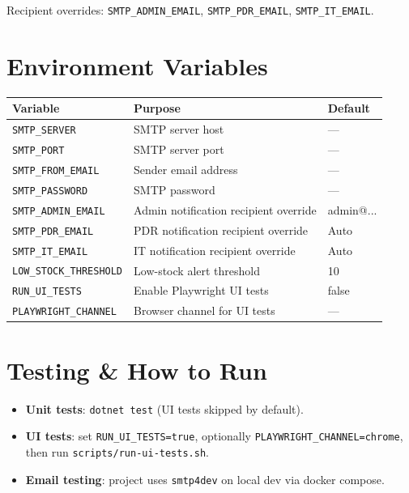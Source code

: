 \documentclass[11pt,a4paper]{article}
\begin{document}
\noindent Recipient overrides: \texttt{SMTP\_ADMIN\_EMAIL}, \texttt{SMTP\_PDR\_EMAIL}, \texttt{SMTP\_IT\_EMAIL}.

\section{Environment Variables}

\begin{longtable}{| l | p{7cm} | l |}
\hline
\textbf{Variable} & \textbf{Purpose} & \textbf{Default} \\
\hline
\endfirsthead
\texttt{SMTP\_SERVER} & SMTP server host & --- \\
\hline
\texttt{SMTP\_PORT} & SMTP server port & --- \\
\hline
\texttt{SMTP\_FROM\_EMAIL} & Sender email address & --- \\
\hline
\texttt{SMTP\_PASSWORD} & SMTP password & --- \\
\hline
\texttt{SMTP\_ADMIN\_EMAIL} & Admin notification recipient override & admin@... \\
\hline
\texttt{SMTP\_PDR\_EMAIL} & PDR notification recipient override & Auto \\
\hline
\texttt{SMTP\_IT\_EMAIL} & IT notification recipient override & Auto \\
\hline
\texttt{LOW\_STOCK\_THRESHOLD} & Low-stock alert threshold & 10 \\
\hline
\texttt{RUN\_UI\_TESTS} & Enable Playwright UI tests & false \\
\hline
\texttt{PLAYWRIGHT\_CHANNEL} & Browser channel for UI tests & --- \\
\hline
\end{longtable}

\section{Testing \& How to Run}
\begin{itemize}
  \item \textbf{Unit tests}: \texttt{dotnet test} (UI tests skipped by default).
  \item \textbf{UI tests}: set \texttt{RUN\_UI\_TESTS=true}, optionally \texttt{PLAYWRIGHT\_CHANNEL=chrome}, then run \texttt{scripts/run-ui-tests.sh}.
  \item \textbf{Email testing}: project uses \texttt{smtp4dev} on local dev via docker compose.
\end{itemize}
\end{document}
